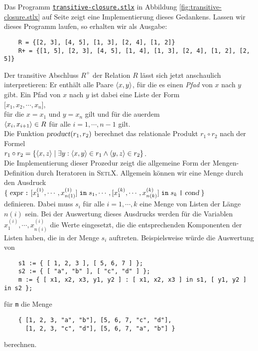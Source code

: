 \noindent
Das Programm 
\href{https://github.com/karlstroetmann/Logik/blob/master/SetlX/transitive-closure.stlx}{\texttt{transitive-closure.stlx}}
in Abbildung
\ref{fig:transitive-closure.stlx} auf Seite \pageref{fig:transitive-closure.stlx}  zeigt
eine Implementierung dieses Gedankens.
Lassen wir dieses Programm laufen, so erhalten wir als Ausgabe:
\begin{verbatim}
    R = {[2, 3], [4, 5], [1, 3], [2, 4], [1, 2]}
    R+ = {[1, 5], [2, 3], [4, 5], [1, 4], [1, 3], [2, 4], [1, 2], [2, 5]}
\end{verbatim}
Der transitive Abschluss $R^+$ der Relation $R$ l\"{a}sst sich jetzt anschaulich
interpretieren:  Er enth\"{a}lt alle Paare $\pair(x,y)$, f\"{u}r die es einen \emph{Pfad} von
$x$ nach $y$ gibt.  Ein Pfad von $x$ nach $y$ ist dabei eine Liste der
Form \\[0.2cm]
\hspace*{1.3cm} $\bigl[ x_1, x_2, \cdots, x_n \bigr]$,
\\[0.2cm]
f\"{u}r die $x = x_1$ und $y = x_n$ gilt und f\"{u}r die au\3erdem 
\\[0.2cm]
\hspace*{1.3cm}
$\pair(x_i, x_{i+1}) \in R$ \quad f\"{u}r alle $i = 1, \cdots, n-1$ gilt.
\\[0.2cm]
Die Funktion $\textsl{product}(r_1, r_2)$ berechnet das relationale Produkt $r_1 \circ
r_2$ nach der Formel
\\[0.2cm]
\hspace*{1.3cm}
$r_1 \circ r_2 = \{ \langle x, z \rangle \mid \exists y: \pair(x,y) \in r_1 \wedge \pair(y,z) \in r_2 \}$.
\\[0.2cm]
Die Implementierung dieser Prozedur  zeigt die allgemeine
Form der Mengen-Defi\-nition durch Iteratoren in \textsc{SetlX}.  Allgemein k\"{o}nnen wir eine Menge
durch den Ausdruck
\\[0.2cm]
\hspace*{1.3cm}
$\{\; \textsl{expr} \;\texttt{:}\; [x^{(1)}_1, \cdots, x^{(1)}_{n(1)}] \;\texttt{in}\; s_1,
     \cdots, [x^{(k)}_1, \cdots, x^{(k)}_{n(k)}] \;\texttt{in}\; s_k \;\texttt{|}\;
     \textsl{cond} \;\}
$
\\[0.2cm]
definieren.  Dabei muss $s_i$ f\"{u}r alle $i=1, \cdots, k$ eine Menge von Listen  der L\"{a}nge
$n(i)$ sein.  Bei der Auswertung dieses Ausdrucks werden f\"{u}r die Variablen 
$x^{(i)}_1, \cdots, x^{(i)}_{n(i)}$ die Werte eingesetzt, die die entsprechenden
Komponenten der Listen haben, die in der Menge $s_i$ auftreten.  Beispielsweise w\"{u}rde die
Auswertung von 
\begin{verbatim}
    s1 := { [ 1, 2, 3 ], [ 5, 6, 7 ] };
    s2 := { [ "a", "b" ], [ "c", "d" ] };
    m := { [ x1, x2, x3, y1, y2 ] : [ x1, x2, x3 ] in s1, [ y1, y2 ] in s2 };
\end{verbatim}
f\"{u}r \texttt{m} die Menge
\begin{verbatim}
    { [1, 2, 3, "a", "b"], [5, 6, 7, "c", "d"],  
      [1, 2, 3, "c", "d"], [5, 6, 7, "a", "b"] }
\end{verbatim}
berechnen. 


